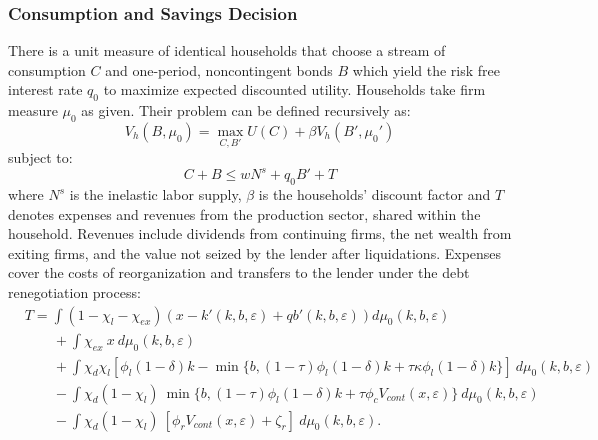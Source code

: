 \documentclass[12pt]{article}
\begin{document}
\subsubsection{Consumption and Savings Decision} \label{sec:Cons and Savings decision}
There is a unit measure of identical households that choose a stream of consumption $C$ and one-period, noncontingent bonds $B$ which yield the risk free interest rate $q_0$ to maximize expected discounted utility. Households take firm measure $\mu_0$ as given. Their problem can be defined recursively as: 
\begin{equation} \label{eq:U_max}
V_h(B, \mu_0) = \max_{C,B'} U(C) + \beta V_h(B',\mu_0')
\end{equation}  
subject to: 
\begin{equation} \label{eq:const_hh}
C + B \leq w N^s + q_0 B' + T
\end{equation} 
where $N^s$ is the inelastic labor supply, $\beta$ is the households' discount factor and $T$ denotes expenses and revenues from the production sector, shared within the household. Revenues include dividends from continuing firms, the net wealth from exiting firms, and the value not seized by the lender after liquidations. Expenses cover the costs of reorganization and transfers to the lender under the debt renegotiation process:
\begin{equation*} \label{eq:T}
    \begin{split}
        & T = \int (1 - \chi_l - \chi_{ex}) \left( x - k'(k,b,\varepsilon) + qb'(k,b,\varepsilon) \right) d \mu_0(k,b,\varepsilon) \\
        & \qquad + \int \chi_{ex} \ x \ d \mu_0(k,b,\varepsilon) \\
        & \qquad + \int \chi_d \chi_{l} [ \phi_l (1-\delta) k -  \min\{b, (1-\tau) \phi_l (1-\delta) k +\tau \kappa \phi_l  (1-\delta) k \} ] \ d \mu_0(k,b,\varepsilon)  \\
        & \qquad  - \int \chi_d (1-\chi_{l}) \ \min\{b, (1-\tau) \phi_l (1-\delta) k +\tau \phi_c V_{cont} (x, \varepsilon)        \} \ d \mu_0(k,b,\varepsilon) \\
        & \qquad  - \int \chi_d (1-\chi_{l}) \  [ \phi_r V_{cont} (x, \varepsilon) + \zeta_r] \ d \mu_0(k,b,\varepsilon).
    \end{split}
\end{equation*}
\end{document}
